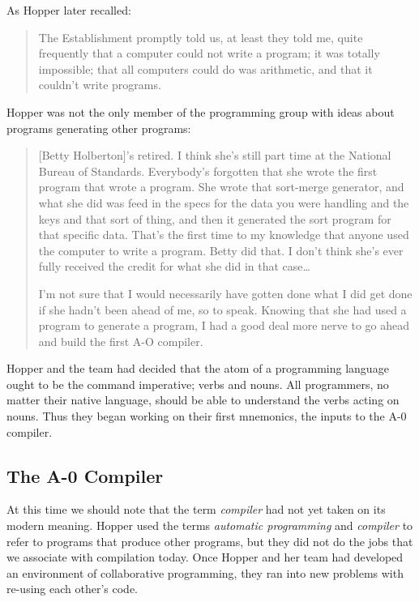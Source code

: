 As Hopper later recalled:
\begin{quotation}
	The Establishment promptly told us, at least they told me, quite
	frequently that a
	computer could not write a program; it was totally impossible; that
	all computers
	could do was arithmetic, and that it couldn't write programs.
	\cite{hopl_keynote}
\end{quotation}

Hopper was not the only member of the programming group with ideas about
programs generating other programs:

\begin{quotation}
	[Betty Holberton]'s retired. I think she's still part time at the
	National Bureau of Standards.
	Everybody's forgotten that she wrote the first program that wrote a
	program. She wrote that
	sort-merge generator, and what she did was feed in the specs for
	the data you were handling
	and the keys and that sort of thing, and then it generated the sort
	program for that specific data.
	That's the first time to my knowledge that anyone used the computer
	to write a program. Betty
	did that. I don't think she's ever fully received the credit for
	what she did in that case\dots

	I'm not sure that I would necessarily have gotten done what I did get done if
	she hadn't been ahead of me, so to speak. Knowing that she had used a program
	to generate a program, I had a good deal more nerve to go ahead and build the
	first A-O compiler.
\end{quotation}

Hopper and the team had decided that the atom of a programming language ought
to be the command imperative; verbs and nouns. All programmers, no matter
their native language, should be able to understand the verbs acting on nouns.
Thus they began working on their first mnemonics, the inputs to the A-0
compiler.

\subsection{The A-0 Compiler}

At this time we should note that the term \textit{compiler} had not yet taken
on its modern meaning. Hopper used the terms \textit{automatic programming} and
\textit{compiler} to refer to programs that produce other programs, but they
did not do the jobs that we associate with compilation today. Once Hopper and
her team had developed an environment of collaborative programming, they ran
into new problems with re-using each other's code.


